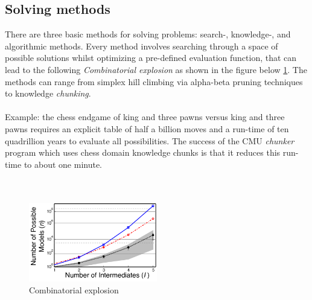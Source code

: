 \subsection{Solving methods}
There are three basic methods for solving problems: 
search-, knowledge-, and algorithmic methods. 
Every method involves searching through a space of possible
 solutions whilst optimizing a pre-defined evaluation function, 
 that can lead to the following \emph{Combinatorial explosion} as shown in the figure below \ref{fig:combiexplo}. 
 The methods can range from simplex hill climbing via alpha-beta
  pruning techniques to knowledge \emph{chunking}. 
\\
\\
Example: the chess endgame of king and three pawns versus king 
and three pawns requires an explicit table of half a billion 
moves and a run-time of ten quadrillion years to evaluate all
possibilities. The success of the CMU \emph{chunker} program which
uses chess domain knowledge chunks is that it reduces this
run-time to about one minute.
\\
\\
\\
\begin{figure}[htb]
    \centering
    \includegraphics[width=0.5\textwidth]{pics/combiexplo.png}
    \caption{Combinatorial explosion} 
    \label{fig:combiexplo}
\end{figure}

